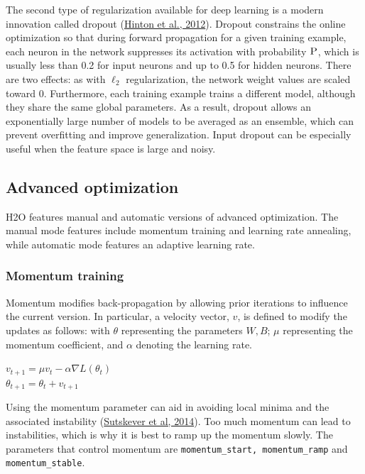 The second type of regularization available for deep learning is a modern innovation called dropout (\href{http://arxiv.org/pdf/1207.0580.pdf}{Hinton et al., 2012}). %
Dropout constrains the online optimization so that during forward propagation for a given training example, each neuron in the network suppresses its activation with probability $\textsc{P}$, which is usually less than 0.2 for input neurons and up to 0.5 for hidden neurons. There are two effects: as with $\ell_2$ regularization, the network weight values are scaled toward 0. Furthermore, each training example trains a different model, although they share the same global parameters. As a result, dropout allows an exponentially large number of models to be averaged as an ensemble, which can prevent overfitting and improve generalization. Input dropout can be especially useful when the feature space is large and noisy.

\subsection{Advanced optimization} 
H2O features manual and automatic versions of advanced optimization. The manual mode features include momentum training and learning rate annealing, while automatic mode features an adaptive learning rate.

\subsubsection{Momentum training}
\label{sssec:MomentumTraining}
Momentum modifies back-propagation by allowing prior iterations to influence the current version. In particular, a velocity vector, $v$, is defined to modify the updates as follows: with $\theta$ representing the parameters $W,B$; $\mu$ representing the momentum coefficient, and $\alpha$ denoting the learning rate. 
\begin{center}
$v_{t+1} = \mu v_t - \alpha \nabla L(\theta_t)$
\\
$\theta_{t+1} = \theta_t + v_{t+1}$
\end{center}
Using the momentum parameter can aid in avoiding 
local minima and the associated instability (\href{http://www.cs.toronto.edu/~fritz/absps/momentum.pdf}{Sutskever et al, 2014}). Too much momentum can lead to instabilities, which is why it is best to ramp up the momentum slowly.  The parameters that control momentum are \texttt{momentum\_start, momentum\_ramp} and \texttt{momentum\_stable}.

